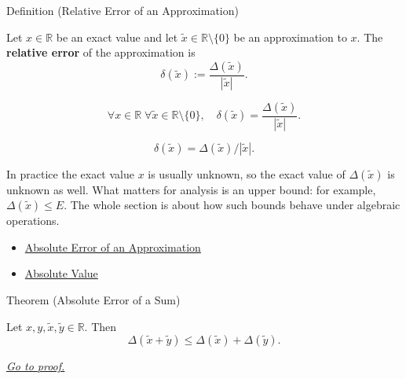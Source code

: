 \begin{definitionbox}{Definition (Relative Error of an Approximation)}
\begin{definition}
\label{def:relative-error-approximation}
Let $x\in\mathbb{R}$ be an exact value and let
$\widetilde{x}\in\mathbb{R}\setminus\{0\}$ be an approximation to $x$. The
\textbf{relative error} of the approximation is
\[
  \delta(\widetilde{x})
  :=
  \frac{\Delta(\widetilde{x})}{|\widetilde{x}|}.
\]
\end{definition}
\end{definitionbox}

\begin{remark*}
\[
\forall x\in\mathbb{R}\;\forall \widetilde{x}\in\mathbb{R}\setminus\{0\},\quad
\delta(\widetilde{x})=\frac{\Delta(\widetilde{x})}{|\widetilde{x}|}.
\]
\end{remark*}

\begin{remark*}
\[
\delta(\widetilde{x})=\Delta(\widetilde{x})/|\widetilde{x}|.
\]
\end{remark*}

\begin{remark*}[Interpretation]
In practice the exact value $x$ is usually unknown, so the exact value of
$\Delta(\widetilde{x})$ is unknown as well. What matters for analysis is an
upper bound: for example, $\Delta(\widetilde{x})\leq E$. The whole section is
about how such bounds behave under algebraic operations.
\end{remark*}

\begin{dependencies}
\begin{itemize}
  \item \hyperref[def:absolute-error-approximation]{Absolute Error of an Approximation}
  \item \hyperref[def:absolute-value]{Absolute Value}
\end{itemize}
\end{dependencies}

\begin{theorembox}{Theorem (Absolute Error of a Sum)}
\begin{theorem}
\label{thm:absolute-error-sum}
Let $x,y,\widetilde{x},\widetilde{y}\in\mathbb{R}$. Then
\[
  \Delta(\widetilde{x}+\widetilde{y})
  \leq
  \Delta(\widetilde{x})+\Delta(\widetilde{y}).
\]

\smallskip\noindent
\hyperref[prf:absolute-error-sum]{\textit{Go to proof.}}
\end{theorem}
\end{theorembox}

